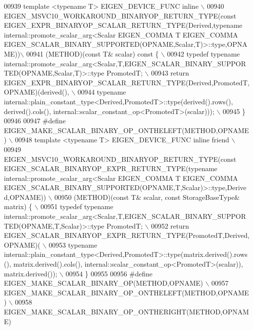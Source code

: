 \begin{DoxyCode}
00939 \textcolor{preprocessor}{  template <typename T> EIGEN\_DEVICE\_FUNC inline \(\backslash\)}
00940 \textcolor{preprocessor}{  EIGEN\_MSVC10\_WORKAROUND\_BINARYOP\_RETURN\_TYPE(const
       EIGEN\_EXPR\_BINARYOP\_SCALAR\_RETURN\_TYPE(Derived,typename internal::promote\_scalar\_arg<Scalar EIGEN\_COMMA T EIGEN\_COMMA
       EIGEN\_SCALAR\_BINARY\_SUPPORTED(OPNAME,Scalar,T)>::type,OPNAME))\(\backslash\)}
00941 \textcolor{preprocessor}{  (METHOD)(const T& scalar) const \{ \(\backslash\)}
00942 \textcolor{preprocessor}{    typedef typename
       internal::promote\_scalar\_arg<Scalar,T,EIGEN\_SCALAR\_BINARY\_SUPPORTED(OPNAME,Scalar,T)>::type PromotedT; \(\backslash\)}
00943 \textcolor{preprocessor}{    return EIGEN\_EXPR\_BINARYOP\_SCALAR\_RETURN\_TYPE(Derived,PromotedT,OPNAME)(derived(), \(\backslash\)}
00944 \textcolor{preprocessor}{           typename internal::plain\_constant\_type<Derived,PromotedT>::type(derived().rows(),
       derived().cols(), internal::scalar\_constant\_op<PromotedT>(scalar))); \(\backslash\)}
00945 \textcolor{preprocessor}{  \}}
00946 
00947 \textcolor{preprocessor}{#define EIGEN\_MAKE\_SCALAR\_BINARY\_OP\_ONTHELEFT(METHOD,OPNAME) \(\backslash\)}
00948 \textcolor{preprocessor}{  template <typename T> EIGEN\_DEVICE\_FUNC inline friend \(\backslash\)}
00949 \textcolor{preprocessor}{  EIGEN\_MSVC10\_WORKAROUND\_BINARYOP\_RETURN\_TYPE(const EIGEN\_SCALAR\_BINARYOP\_EXPR\_RETURN\_TYPE(typename
       internal::promote\_scalar\_arg<Scalar EIGEN\_COMMA T EIGEN\_COMMA
       EIGEN\_SCALAR\_BINARY\_SUPPORTED(OPNAME,T,Scalar)>::type,Derived,OPNAME)) \(\backslash\)}
00950 \textcolor{preprocessor}{  (METHOD)(const T& scalar, const StorageBaseType& matrix) \{ \(\backslash\)}
00951 \textcolor{preprocessor}{    typedef typename
       internal::promote\_scalar\_arg<Scalar,T,EIGEN\_SCALAR\_BINARY\_SUPPORTED(OPNAME,T,Scalar)>::type PromotedT; \(\backslash\)}
00952 \textcolor{preprocessor}{    return EIGEN\_SCALAR\_BINARYOP\_EXPR\_RETURN\_TYPE(PromotedT,Derived,OPNAME)( \(\backslash\)}
00953 \textcolor{preprocessor}{           typename internal::plain\_constant\_type<Derived,PromotedT>::type(matrix.derived().rows(),
       matrix.derived().cols(), internal::scalar\_constant\_op<PromotedT>(scalar)), matrix.derived()); \(\backslash\)}
00954 \textcolor{preprocessor}{  \}}
00955 
00956 \textcolor{preprocessor}{#define EIGEN\_MAKE\_SCALAR\_BINARY\_OP(METHOD,OPNAME) \(\backslash\)}
00957 \textcolor{preprocessor}{  EIGEN\_MAKE\_SCALAR\_BINARY\_OP\_ONTHELEFT(METHOD,OPNAME) \(\backslash\)}
00958 \textcolor{preprocessor}{  EIGEN\_MAKE\_SCALAR\_BINARY\_OP\_ONTHERIGHT(METHOD,OPNAME)}

\end{DoxyCode}

